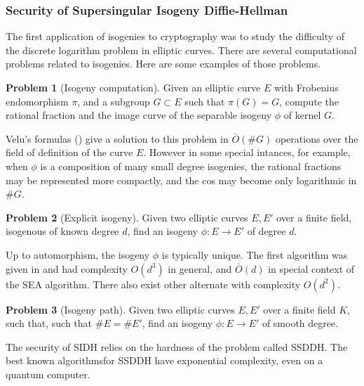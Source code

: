 \documentclass{article}
\theoremstyle{theorem}
\theoremstyle{definition}
\newtheorem{problem}{Problem}
\begin{document}
\subsubsection{Security of Supersingular Isogeny Diffie-Hellman}

The first application of isogenies to cryptography was to study  the difficulty of the discrete logarithm problem in elliptic curves. There are several computational problems related to isogenies. Here are some examples of those problems.

\begin{problem}[Isogeny computation]
	Given an elliptic curve $E$ with Frobenius endomorphism  $\pi$, and a subgroup $G \subset E$ such that $\pi(G) = G$, compute the rational fraction and the image curve of the separable isogeny $\phi$ of kernel $G$.
\end{problem}

Velu's formulas (\cite[Proposition 38]{IsogenyCryptoDeFeo}) give a solution to this problem in $\bar{O}(\#G)$ operations over the field of definition of the curve $E$. However in some special intances, for example, when $\phi$ is a composition of many small degree isogenies, the rational fractions may be represented more compactly, and the cos may become only logarithmic in $\#G$.

\begin{problem}[Explicit isogeny]
	Given two elliptic curves $E, E'$ over a finite field, isogenous of known degree $d$, find an isogeny $\phi: E \to E'$ of degree $d$.
\end{problem}

Up to automorphism, the isogeny $\phi$ is typically unique. The first algorithm was given in \cite{Elkies98} and had complexity $O(d^3)$ in general, and $\bar{O}(d)$ in special context  of the SEA algorithm. There also exist other alternate with complexity $O(d^2)$.

\begin{problem}[Isogeny path]
	Given two elliptic curves $E, E'$ over a finite field $K$, such that, such that $\#E = \#E'$, find an isogeny $\phi: E \to E'$ of smooth degree.
\end{problem}

The security of SIDH relies on the hardness of the problem called SSDDH. The best known algorithmsfor SSDDH have exponential complexity, even on a quantum computer.
\end{document}
